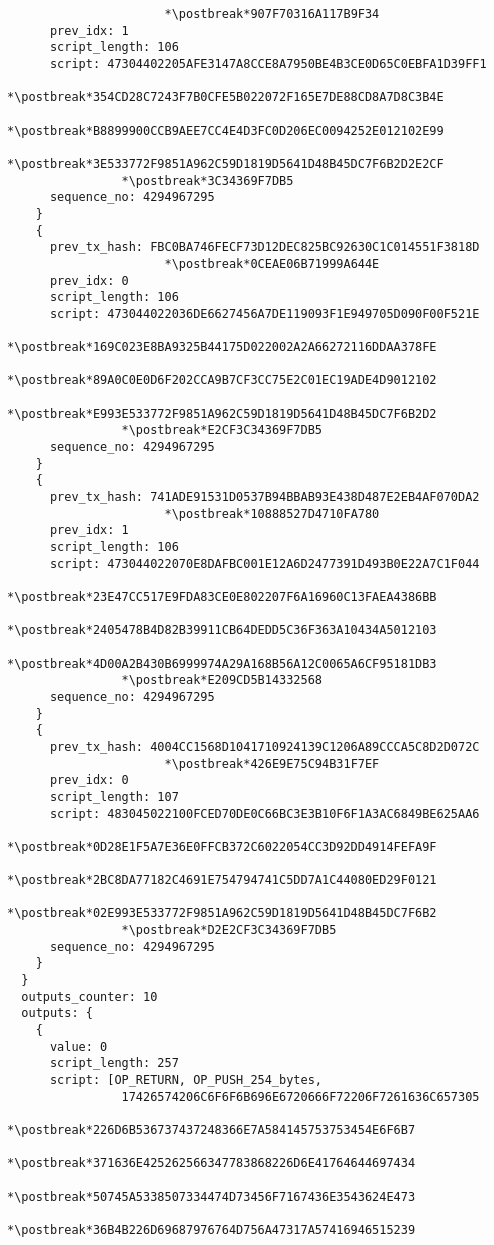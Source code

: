 \begin{lstlisting}
                      *\postbreak*907F70316A117B9F34
      prev_idx: 1
      script_length: 106
      script: 47304402205AFE3147A8CCE8A7950BE4B3CE0D65C0EBFA1D39FF1
                *\postbreak*354CD28C7243F7B0CFE5B022072F165E7DE88CD8A7D8C3B4E
                *\postbreak*B8899900CCB9AEE7CC4E4D3FC0D206EC0094252E012102E99
                *\postbreak*3E533772F9851A962C59D1819D5641D48B45DC7F6B2D2E2CF
                *\postbreak*3C34369F7DB5
      sequence_no: 4294967295
    }
    {
      prev_tx_hash: FBC0BA746FECF73D12DEC825BC92630C1C014551F3818D
                      *\postbreak*0CEAE06B71999A644E
      prev_idx: 0
      script_length: 106
      script: 473044022036DE6627456A7DE119093F1E949705D090F00F521E
                *\postbreak*169C023E8BA9325B44175D022002A2A66272116DDAA378FE
                *\postbreak*89A0C0E0D6F202CCA9B7CF3CC75E2C01EC19ADE4D9012102
                *\postbreak*E993E533772F9851A962C59D1819D5641D48B45DC7F6B2D2
                *\postbreak*E2CF3C34369F7DB5
      sequence_no: 4294967295
    }
    {
      prev_tx_hash: 741ADE91531D0537B94BBAB93E438D487E2EB4AF070DA2
                      *\postbreak*10888527D4710FA780
      prev_idx: 1
      script_length: 106
      script: 473044022070E8DAFBC001E12A6D2477391D493B0E22A7C1F044
                *\postbreak*23E47CC517E9FDA83CE0E802207F6A16960C13FAEA4386BB
                *\postbreak*2405478B4D82B39911CB64DEDD5C36F363A10434A5012103
                *\postbreak*4D00A2B430B6999974A29A168B56A12C0065A6CF95181DB3
                *\postbreak*E209CD5B14332568
      sequence_no: 4294967295
    }
    {
      prev_tx_hash: 4004CC1568D1041710924139C1206A89CCCA5C8D2D072C
                      *\postbreak*426E9E75C94B31F7EF
      prev_idx: 0
      script_length: 107
      script: 483045022100FCED70DE0C66BC3E3B10F6F1A3AC6849BE625AA6
                *\postbreak*0D28E1F5A7E36E0FFCB372C6022054CC3D92DD4914FEFA9F
                *\postbreak*2BC8DA77182C4691E754794741C5DD7A1C44080ED29F0121
                *\postbreak*02E993E533772F9851A962C59D1819D5641D48B45DC7F6B2
                *\postbreak*D2E2CF3C34369F7DB5
      sequence_no: 4294967295
    }
  }
  outputs_counter: 10
  outputs: {
    {
      value: 0
      script_length: 257
      script: [OP_RETURN, OP_PUSH_254_bytes,
                17426574206C6F6F6B696E6720666F72206F7261636C657305
                  *\postbreak*226D6B536737437248366E7A584145753753454E6F6B7
                  *\postbreak*371636E425262566347783868226D6E41764644697434
                  *\postbreak*50745A5338507334474D73456F7167436E3543624E473
                  *\postbreak*36B4B226D69687976764D756A47317A57416946515239

\end{lstlisting}
